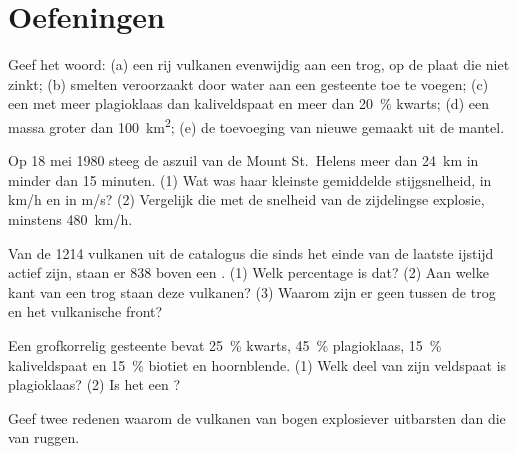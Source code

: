 \section{Oefeningen}

\begin{exercise}[$\star$]\label{exo:g12:subduction-magmatism:1}
Geef het woord: (a) een rij vulkanen evenwijdig aan een trog, op de plaat
die niet zinkt; (b) smelten veroorzaakt door water aan een gesteente toe te voegen; (c) een
 met meer plagioklaas dan kaliveldspaat en meer dan
\qty{20}{\percent} kwarts; (d) een massa  groter dan
\qty{100}{km^2}; (e) de toevoeging van nieuwe  gemaakt uit de
mantel.
\end{exercise}

\begin{exercise}[$\star$]\label{exo:g12:subduction-magmatism:2}
Op 18 mei 1980 steeg de aszuil van de Mount St.~Helens meer dan \qty{24}{km}
in minder dan 15 minuten. (1) Wat was haar kleinste gemiddelde stijgsnelheid, in
\unit{km/h} en in \unit{m/s}? (2) Vergelijk die met de snelheid van de zijdelingse
explosie, minstens \qty{480}{km/h}.
\end{exercise}

\begin{exercise}[$\star$]\label{exo:g12:subduction-magmatism:3}
Van de 1214 vulkanen uit de catalogus die sinds het einde van de laatste
ijstijd actief zijn, staan er 838 boven een . (1) Welk percentage is dat? (2) Aan
welke kant van een trog staan deze vulkanen? (3) Waarom zijn er geen tussen
de trog en het vulkanische front?
\end{exercise}

\begin{exercise}[$\star$]\label{exo:g12:subduction-magmatism:4}
Een grofkorrelig gesteente bevat \qty{25}{\percent} kwarts, \qty{45}{\percent}
plagioklaas, \qty{15}{\percent} kaliveldspaat en \qty{15}{\percent}
biotiet en hoornblende. (1) Welk deel van zijn veldspaat is plagioklaas?
(2) Is het een ?
\end{exercise}

\begin{exercise}[$\star$]\label{exo:g12:subduction-magmatism:5}
Geef twee redenen waarom de vulkanen van bogen explosiever uitbarsten dan die
van ruggen.
\end{exercise}

